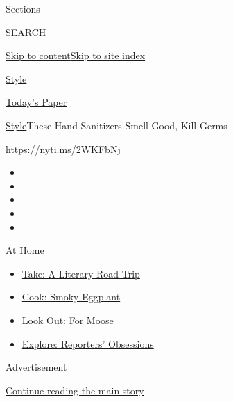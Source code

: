 Sections

SEARCH

\protect\hyperlink{site-content}{Skip to
content}\protect\hyperlink{site-index}{Skip to site index}

\href{https://www.nytimes.com/section/style}{Style}

\href{https://myaccount.nytimes.com/auth/login?response_type=cookie\&client_id=vi}{}

\href{https://www.nytimes.com/section/todayspaper}{Today's Paper}

\href{/section/style}{Style}\textbar{}These Hand Sanitizers Smell Good,
Kill Germs

\url{https://nyti.ms/2WKFbNj}

\begin{itemize}
\item
\item
\item
\item
\item
\end{itemize}

\href{https://www.nytimes.com/spotlight/at-home?action=click\&pgtype=Article\&state=default\&region=TOP_BANNER\&context=at_home_menu}{At
Home}

\begin{itemize}
\tightlist
\item
  \href{https://www.nytimes.com/2020/07/28/books/time-for-a-literary-road-trip.html?action=click\&pgtype=Article\&state=default\&region=TOP_BANNER\&context=at_home_menu}{Take:
  A Literary Road Trip}
\item
  \href{https://www.nytimes.com/2020/07/29/magazine/bored-with-your-home-cooking-some-smoky-eggplant-will-fix-that.html?action=click\&pgtype=Article\&state=default\&region=TOP_BANNER\&context=at_home_menu}{Cook:
  Smoky Eggplant}
\item
  \href{https://www.nytimes.com/2020/07/27/travel/moose-michigan-isle-royale.html?action=click\&pgtype=Article\&state=default\&region=TOP_BANNER\&context=at_home_menu}{Look
  Out: For Moose}
\item
  \href{https://www.nytimes.com/interactive/2020/at-home/even-more-reporters-editors-diaries-lists-recommendations.html?action=click\&pgtype=Article\&state=default\&region=TOP_BANNER\&context=at_home_menu}{Explore:
  Reporters' Obsessions}
\end{itemize}

Advertisement

\protect\hyperlink{after-top}{Continue reading the main story}

